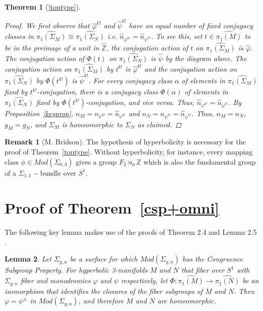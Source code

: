 \documentclass[12pt, reqno,oneside]{amsart}
\newtheorem{lemma}{Lemma}[section]
\theoremstyle{definition}
\newtheorem{rmk}[lemma]{Remark}
\theoremstyle{plain}
\theoremstyle{TheoremNum}
\newtheorem{thmn}{Theorem}
\newcommand{\Z}{{\mathbb Z}}
\numberwithin{equation}{section}
\numberwithin{table}{section}
\begin{document}
\begin{thmn}[\ref{toptype}]
\begin{proof}
\medbreak We first observe that $\hat{\varphi}^{k!}$ and $\hat{\psi}^{k!}$ have an equal number of fixed conjugacy classes in $\widehat{\pi_1(\Sigma_M)}\cong\widehat{\pi_1(\Sigma_N)}$ i.e. $\hat{n}_{\varphi^{k!}}=\hat{n}_{\psi^{k!}}$. To see this, set $t\in\widehat{\pi_1(M)}$ to be in the preimage of a unit in $\hat{\Z}$, the conjugation action of $t$ on $\widehat{\pi_1(\Sigma_M)}$ is $\hat{\varphi}$. The conjugation action of $\Phi(t)$ on $\widehat{\pi_1(\Sigma_N)}$ is $\hat{\psi}$ by the diagram above. The conjugation action on $\widehat{\pi_1(\Sigma_M)}$ by $t^{k!}$ is $\hat{\varphi}^{k!}$ and the conjugation action on $\widehat{\pi_1(\Sigma_N)}$ by $\Phi(t^{k!})$ is $\hat{\psi}^{k!}$. For every conjugacy class $\alpha$ of elements in $\widehat{\pi_1(\Sigma_M)}$ fixed by $t^{k!}$-conjugation, there is a conjugacy class $\Phi(\alpha)$ of elements in $\widehat{\pi_1(\Sigma_N)}$ fixed by $\Phi(t^{k!})$-conjugation, and vice versa. Thus, $\hat{n}_{\varphi^{k!}}=\hat{n}_{\psi^{k!}}$. By Proposition~\ref{keyprop}, $n_M=n_{\varphi^{k!}}=\hat{n}_{\varphi^{k!}}$ and $n_N=n_{\psi^{k!}}=\hat{n}_{\psi^{k!}}$. Thus, $n_M=n_N$, $g_M=g_N$, and $\Sigma_M$ is homeomorphic to $\Sigma_N$ as claimed. 
\end{proof}

\end{thmn}
\begin{rmk}[M. Bridson]\label{bridsonrmk}
    The hypothesis of hyperbolicity is necessary for the proof of Theorem~\ref{toptype}. Without hyperbolicity, for instance, every mapping class $\phi\in Mod(\Sigma_{0,3})$ gives a group $F_2\rtimes_\phi\Z$ which is also the fundamental group of a $\Sigma_{1,1}-$bundle over $S^1$. 
\end{rmk}

\section{Proof of Theorem~\ref{csp+omni}}
The following key lemma makes use of the proofs of Theorem 2.4 and Lemma 2.5 \cite{BRW}. 
\begin{lemma}\label{LiuplusBRW}
Let $\Sigma_{g,n}$ be a surface for which $Mod(\Sigma_{g,n})$ has the Congruence Subgroup Property. For hyperbolic 3-manifolds $M$ and $N$ that fiber over $S^1$ with $\Sigma_{g,n}$ fiber and monodromies $\varphi$ and $\psi$ respectively, let $\Phi:\widehat{\pi_1(M)}\to\widehat{\pi_1(N)}$ be an isomorphism that identifies the closures of the fiber subgroups of $M$ and $N$. Then $\varphi=\psi^{\pm}$ in $Mod(\Sigma_{g,n})$, and therefore $M$ and $N$ are homeomorphic. 
\end{lemma}
\end{document}
